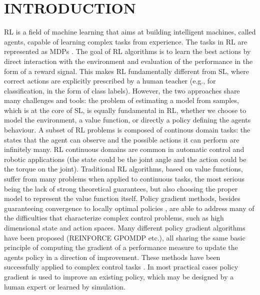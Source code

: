 
\chapter{INTRODUCTION} \label{chap:aChapter}

\acf{RL} is a field of machine learning that aims at building intelligent machines, called agents, capable of learning complex tasks from experience.
The tasks in \acs{RL} are represented as \acf{MDP}s \citep{puterman1990markov}. 
The goal of \acs{RL} \citep{sutton1998reinforcement} algorithms is to learn the best actions by direct interaction with the environment and evaluation of the performance in the form of a reward signal.
This makes \acs{RL} fundamentally different from \acf{SL}, where correct actions are explicitly prescribed by a human teacher (e.g., for classification, in the form of class labels).
However, the two approaches share many challenges and tools: the problem of estimating a model from samples, which is at the core of \acs{SL}, is equally fundamental in \acs{RL}, whether we choose to model the environment, a value function, or directly a policy defining the agent\textquotesingle s behaviour.
A subset of \acs{RL} problems is composed of continous domain tasks: the states that the agent can observe and the possible actions it can perform are infinitely many.
\acs{RL} continuous domains are common in automatic control and robotic applications (\eg the state could be the joint angle and the action could be the torque on the joint). Traditional \acs{RL} algorithms, based on value functions, suffer from many problems when applied to continuous tasks, the most serious being the lack of strong theoretical guarantees, but also choosing the proper model to represent the value function itself. Policy gradient methods, besides guaranteeing convergence to locally optimal policies \citep{sutton2000policy}, are able to address many of the difficulties that characterize complex control problems, such as high dimensional state and action spaces. 
Many different policy gradient algorithms have been proposed (\eg REINFORCE \citep{williams1992simple} GPOMDP \citep{baxter2001infinite} etc.), all sharing the same basic principle of computing the gradient of a performance measure to update the agent\textquotesingle s policy in a direction of improvement. These methods have been successfully applied to complex control tasks \citep{deisenroth2013survey}. In most practical cases policy gradient is used to improve an existing policy, which may be designed by a human expert or learned by simulation.\newline

